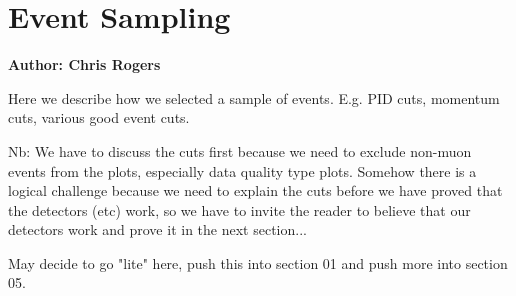 \section{Event Sampling}
\label{Sect:EventSampling}

\bf{Author: Chris Rogers}

Here we describe how we selected a sample of events. E.g. PID cuts, momentum
cuts, various good event cuts.

Nb: We have to discuss the cuts first because we need to exclude non-muon events
from the plots, especially data quality type plots. Somehow there is a logical 
challenge because we need to explain the cuts before we have proved that the 
detectors (etc) work, so we have to invite the reader to believe that our 
detectors work and prove it in the next section...

May decide to go "lite" here, push this into section 01 and push more into section 05.




